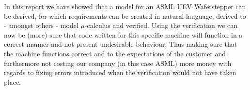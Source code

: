 
In this report we have showed that a model for an ASML UEV Waferstepper can be derived, for which requirements can be created in natural language, derived to - amongst others - model $\mu$-calculus and verified. Using the verification we can now be (more) sure that code written for this specific machine will function in a correct manner and not present undesirable behaviour. Thus making sure that the machine functions correct and to the expectations of the customer and furthermore not costing our company (in this case ASML) more money with regards to fixing errors introduced when the verification would not have taken place.